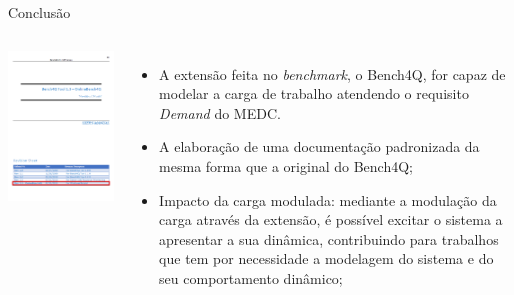 \begin{frame}{Conclusão}
	\begin{columns}
		\begin{minipage}[c][0.4\textheight][c]{\linewidth}
			\centering
			\includegraphics[width=1\linewidth]{images/capa-documentacao.png}
			\label{fig:documentacao}	
		\end{minipage}
		\begin{minipage}[c][0.4\textheight][c]{\linewidth}
			\begin{itemize}
				\item A extensão feita no \textit{benchmark}, o Bench4Q, for capaz de modelar a carga de trabalho atendendo o requisito \textit{Demand} do MEDC.
				
				\item A elaboração de uma documentação padronizada da mesma forma que a original do Bench4Q;
				
				\item Impacto da carga modulada: mediante a modulação da carga através da extensão, é possível excitar o sistema a apresentar a sua dinâmica, contribuindo para trabalhos que tem por necessidade a modelagem do sistema e do seu comportamento dinâmico;
			\end{itemize} 
		\end{minipage}		
	\end{columns}	
\end{frame}

